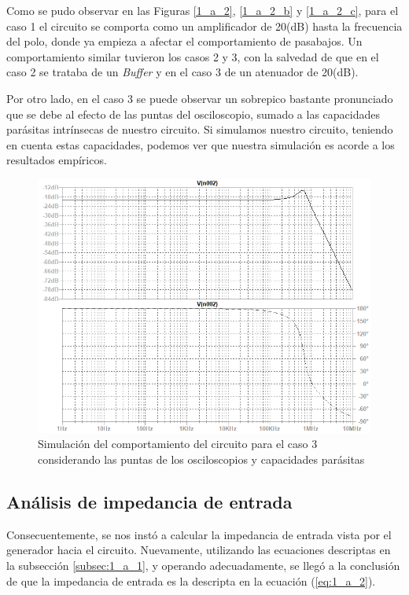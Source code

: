 Como se pudo observar en las Figuras \ref{1_a_2}, \ref{1_a_2_b}
y \ref{1_a_2_c}, para el caso 1 el circuito se comporta como un amplificador
de 20(dB) hasta la frecuencia del polo, donde ya empieza a afectar
el comportamiento de pasabajos. Un comportamiento similar tuvieron
los casos 2 y 3, con la salvedad de que en el caso 2 se trataba de
un \emph{Buffer} y en el caso 3 de un atenuador de 20(dB).

Por otro lado, en el caso 3 se puede observar un sobrepico bastante
pronunciado que se debe al efecto de las puntas del osciloscopio,
sumado a las capacidades parásitas intrínsecas de nuestro circuito.
Si simulamos nuestro circuito, teniendo en cuenta estas capacidades,
podemos ver que nuestra simulación es acorde a los resultados empíricos.

\begin{figure}[H]
\begin{centering}
\includegraphics[scale=0.5]{../Ex1/iA/Resources1a/H3_para}
\par\end{centering}
\caption{Simulación del comportamiento del circuito para el caso 3 considerando
las puntas de los osciloscopios y capacidades parásitas}

\end{figure}

\subsection{Análisis de impedancia de entrada\label{subsec:1_a_2}}

Consecuentemente, se nos instó a calcular la impedancia de entrada
vista por el generador hacia el circuito. Nuevamente, utilizando las
ecuaciones descriptas en la subsección \ref{subsec:1_a_1}, y operando
adecuadamente, se llegó a la conclusión de que la impedancia de entrada
es la descripta en la ecuación (\ref{eq:1_a_2}).

